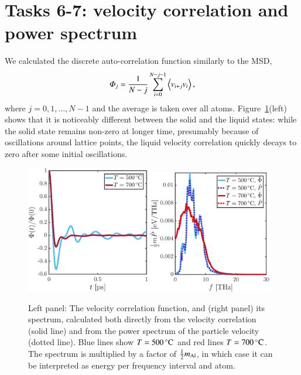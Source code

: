 

\section*{Tasks 6-7: velocity correlation and power spectrum}

We calculated the discrete auto-correlation function similarly to the
MSD, 
\begin{equation}
\varPhi_j = \frac{1}{N-j}\sum_{i=0}^{N-j-1} \ev{v_{i+j}v_{i}},
\end{equation}
where $j=0,1,\ldots,N-1$ and the average is taken over all atoms. Figure~\ref{fig:spectrum}(left) shows that it is noticeably different between the solid and the liquid states: while the solid state remains non-zero at longer time, presumably because of oscillations around lattice points, the liquid velocity correlation quickly decays to zero after some initial oscillations. 

\begin{figure}[!ht]
\begin{center}
  \includegraphics[width=0.48\textwidth]{../figures/Phi-t} 
    \includegraphics[width=0.48\textwidth]{../figures/P-freq} 
  \caption{Left panel: The velocity correlation function, and (right panel) its spectrum, calculated both directly from the velocity correlation (solid line) and from the power spectrum of the particle velocity (dotted line). Blue lines show $T=\unit[500]{^\circ C}$ and red lines $T=\unit[700]{^\circ C}$. The spectrum is multiplied by a factor of $\tfrac{1}{2} m_{\rm Al}$, in which case it can be interpreted as energy per frequency interval and atom. }
  \label{fig:spectrum}
\end{center}
\end{figure}


